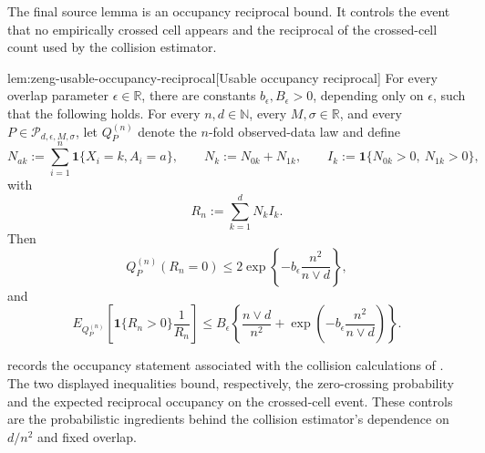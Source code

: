 The final source lemma is an occupancy reciprocal bound. It controls the event that no empirically crossed cell appears and the reciprocal of the crossed-cell count used by the collision estimator.

\begin{lemmav}{lem:zeng-usable-occupancy-reciprocal}[Usable occupancy reciprocal]
For every overlap parameter \(\epsilon\in\mathbb R\), there are constants
\(b_{\epsilon},B_{\epsilon}>0\), depending only on \(\epsilon\), such that the following holds.
For every \(n,d\in\mathbb N\), every \(M,\sigma\in\mathbb R\), and every
\(P\in\mathcal P_{d,\epsilon,M,\sigma}\), let \(Q_P^{(n)}\) denote the \(n\)-fold observed-data law and define
\[
N_{ak}:=\sum_{i=1}^n \mathbf 1\{X_i=k,A_i=a\},\qquad
N_k:=N_{0k}+N_{1k},\qquad
I_k:=\mathbf 1\{N_{0k}>0,\ N_{1k}>0\},
\]
with
\[
R_n:=\sum_{k=1}^d N_k I_k .
\]
Then
\[
Q_P^{(n)}(R_n=0)
\le
2\exp\left\{-b_{\epsilon}\frac{n^2}{n\vee d}\right\},
\]
and
\[
E_{Q_P^{(n)}}\left[
\mathbf 1\{R_n>0\}\frac{1}{R_n}
\right]
\le
B_{\epsilon}\left\{
\frac{n\vee d}{n^2}
+
\exp\left(-b_{\epsilon}\frac{n^2}{n\vee d}\right)
\right\}.
\]
\end{lemmav}

 records the occupancy statement associated with the collision calculations of \citet{ZengBalakrishnanHanKennedy2024}. The two displayed inequalities bound, respectively, the zero-crossing probability and the expected reciprocal occupancy on the crossed-cell event. These controls are the probabilistic ingredients behind the collision estimator's dependence on \(d/n^2\) and fixed overlap.
